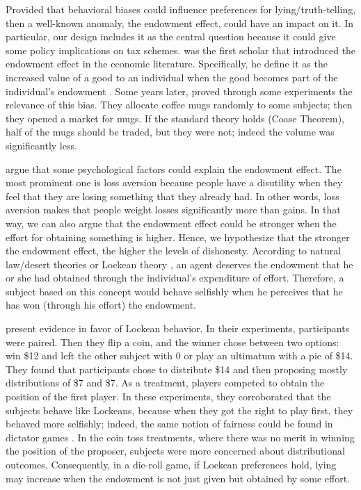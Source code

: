 \documentclass[12pt,final]{article}
\begin{document}
Provided that behavioral biases could influence preferences for lying/truth-telling, then a well-known anomaly, the endowment effect, could have an impact on it. In particular, our design includes it as the central question because it could give some policy implications on tax schemes. \citet{Thaler1980} was the first scholar that introduced the endowment effect in the economic literature.  Specifically, he define it as the increased value of a good to an individual when the good becomes part of the individual's endowment \citep{Thaler1980}.  Some years later, \citet{Kahneman2011} proved through some experiments the relevance of this bias. They allocate coffee mugs randomly to some subjects; then they opened a market for mugs. If the standard theory holds (Coase Theorem), half of the mugs should be traded, but they were not; indeed the volume was significantly less. 

\citet{Kahneman2011} argue that some psychological factors could explain the endowment effect. The most prominent one is loss aversion \citep{Tversky1991,Tom2007} because people have a disutility when they feel that they are losing something that they already had. In other words, loss aversion makes that people weight losses significantly more than gains. In that way, we can also argue that the endowment effect could be stronger when the effort for obtaining something is higher. Hence, we hypothesize that the stronger the endowment effect, the higher the levels of dishonesty. According to natural law/desert theories or Lockean theory \citep{Locke1978}, an agent deserves the endowment that he or she had obtained through the individual's expenditure of effort. Therefore, a subject based on this concept would behave selfishly when he perceives that he has won (through his effort) the endowment.

\citet{Hoffman1985} present evidence in favor of Lockean behavior. In their experiments, participants were paired. Then they flip a coin, and the winner chose between two options: win \$12 and left the other subject with 0 or play an ultimatum with a pie of \$14. They found that participants chose to distribute \$14 and then proposing mostly distributions of \$7 and  \$7. As a treatment,  players competed to obtain the position of the first player. In these experiments, they corroborated that the subjects behave like Lockeans, because when they got the right to play first, they behaved more selfishly; indeed, the same notion of fairness could be found in dictator games \citep{Cherry2002,ALEXANDER2007,Almas2010}.  In the coin toss treatments, where there was no merit in winning the position of the proposer, subjects were more concerned about distributional outcomes. Consequently, in a die-roll game, if Lockean preferences hold, lying may increase when the endowment is not just given but obtained by some effort.
\end{document}

